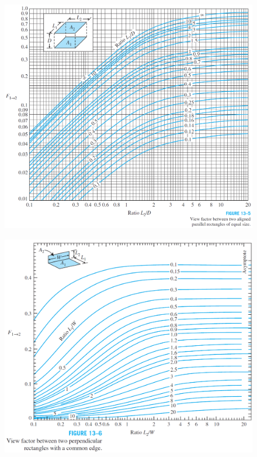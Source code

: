 \begin{itemize}
    \begin{figure}[H]
        \includegraphics[width=1.0\linewidth]{images/view_factor_chart_1.png}
    \end{figure}
    \begin{figure}[H]
        \includegraphics[width=1.0\linewidth]{images/view_factor_chart_2.png}
    \end{figure}
    \begin{figure}[H]

\end{figure}
\end{itemize}
